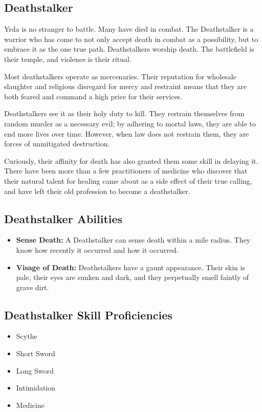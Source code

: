 \begin{multicols}{2}
\section{Deathstalker}

Yrda is no stranger to battle. Many have died in combat. The Deathstalker
is a warrior who has come to not only accept death in combat as a possibility,
but to embrace it as the one true path. Deathstalkers worship death. The
battlefield is their temple, and violence is their ritual.

Most deathstalkers operate as mercenaries. Their reputation for wholesale
slaughter and religious disregard for mercy and restraint means that they
are both feared and command a high price for their services.

Deathstalkers see it as their holy duty to kill. They restrain themselves
from random murder as a necessary evil; by adhering to mortal laws, they
are able to end more lives over time. However, when law does not restrain
them, they are forces of unmitigated destruction.

Curiously, their affinity for death has also granted them some skill in
delaying it. There have been more than a few practitioners of medicine
who discover that their natural talent for healing came about as a side
effect of their true calling, and have left their old profession to become
a deathstalker.

\subsection{Deathstalker Abilities}

\begin{itemize}
  \item \textbf{Sense Death:} A Deathstalker can sense death within a
    mile radius. They know how recently it occurred and how it occurred.
  \item \textbf{Visage of Death:} Deathstalkers have a gaunt appearance.
    Their skin is pale, their eyes are sunken and dark, and they perpetually
    smell faintly of grave dirt.
\end{itemize}

\subsection{Deathstalker Skill Proficiencies}

\begin{itemize}
  \item Scythe
  \item Short Sword
  \item Long Sword
  \item Intimidation
  \item Medicine
\end{itemize}


\end{multicols}
